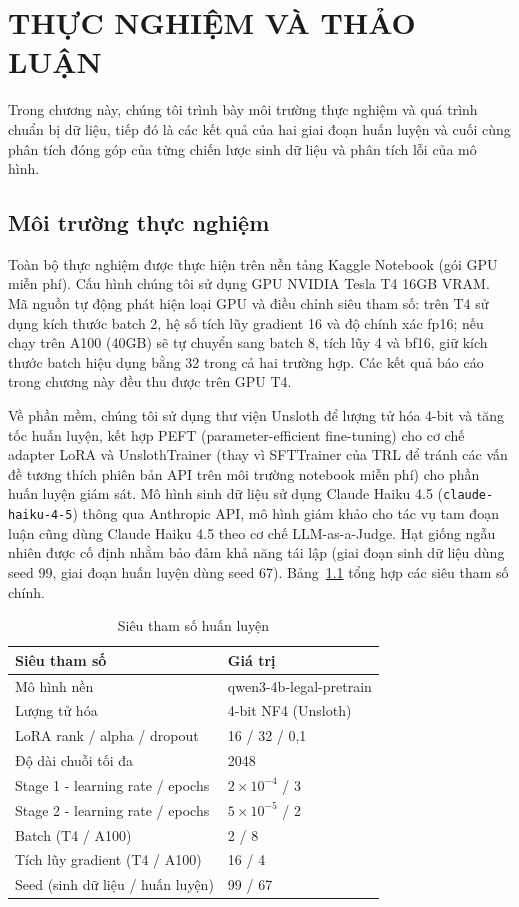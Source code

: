 \chapter{THỰC NGHIỆM VÀ THẢO LUẬN}

Trong chương này, chúng tôi trình bày môi trường thực nghiệm và quá trình chuẩn bị dữ liệu, tiếp đó là các kết quả của hai giai đoạn huấn luyện và cuối cùng phân tích đóng góp của từng chiến lược sinh dữ liệu và phân tích lỗi của mô hình.

\section{Môi trường thực nghiệm}

Toàn bộ thực nghiệm được thực hiện trên nền tảng Kaggle Notebook (gói GPU miễn phí). Cấu hình chúng tôi sử dụng GPU NVIDIA Tesla T4 16GB VRAM. Mã nguồn tự động phát hiện loại GPU và điều chỉnh siêu tham số: trên T4 sử dụng kích thước batch 2, hệ số tích lũy gradient 16 và độ chính xác fp16; nếu chạy trên A100 (40GB) sẽ tự chuyển sang batch 8, tích lũy 4 và bf16, giữ kích thước batch hiệu dụng bằng 32 trong cả hai trường hợp. Các kết quả báo cáo trong chương này đều thu được trên GPU T4.

Về phần mềm, chúng tôi sử dụng thư viện Unsloth để lượng tử hóa 4-bit và tăng tốc huấn luyện, kết hợp PEFT (parameter-efficient fine-tuning) cho cơ chế adapter LoRA và UnslothTrainer (thay vì SFTTrainer của TRL để tránh các vấn đề tương thích phiên bản API trên môi trường notebook miễn phí) cho phần huấn luyện giám sát. Mô hình sinh dữ liệu sử dụng Claude Haiku 4.5 (\texttt{claude-haiku-4-5}) thông qua Anthropic API, mô hình giám khảo cho tác vụ tam đoạn luận cũng dùng Claude Haiku 4.5 theo cơ chế LLM-as-a-Judge. Hạt giống ngẫu nhiên được cố định nhằm bảo đảm khả năng tái lập (giai đoạn sinh dữ liệu dùng seed 99, giai đoạn huấn luyện dùng seed 67). Bảng~\ref{tab:hyperparams} tổng hợp các siêu tham số chính.

\begin{table}[ht]
\centering
\begin{tabular}{ll}
\toprule
\textbf{Siêu tham số} & \textbf{Giá trị} \\
\midrule
Mô hình nền & qwen3-4b-legal-pretrain \\
Lượng tử hóa & 4-bit NF4 (Unsloth) \\
LoRA rank / alpha / dropout & 16 / 32 / 0,1 \\
Độ dài chuỗi tối đa & 2048 \\
Stage 1 - learning rate / epochs & $2\times10^{-4}$ / 3 \\
Stage 2 - learning rate / epochs & $5\times10^{-5}$ / 2 \\
Batch (T4 / A100) & 2 / 8 \\
Tích lũy gradient (T4 / A100) & 16 / 4 \\
Seed (sinh dữ liệu / huấn luyện) & 99 / 67 \\
\bottomrule
\end{tabular}
\caption{Siêu tham số huấn luyện}
\label{tab:hyperparams}
\end{table}

